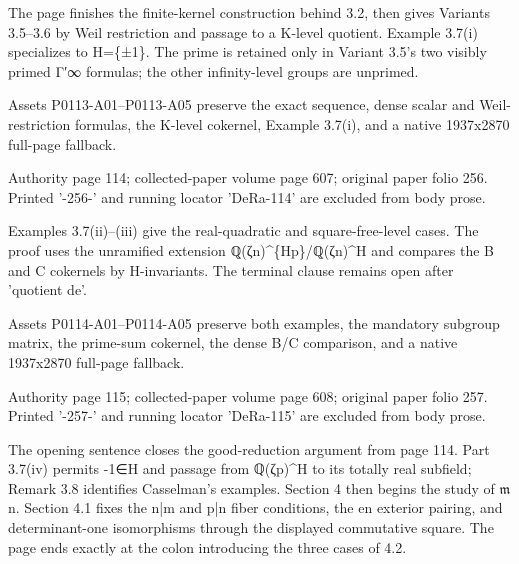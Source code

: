 \documentclass[11pt,a4paper]{article}
\begin{document}
The page finishes the finite-kernel construction behind 3.2, then gives Variants 3.5--3.6 by Weil restriction and passage to a K-level quotient. Example 3.7(i) specializes to H=\{±1\}. The prime is retained only in Variant 3.5's two visibly primed Γ′\textunderscore{}∞ formulas; the other infinity-level groups are unprimed.

Assets P0113-A01--P0113-A05 preserve the exact sequence, dense scalar and Weil-restriction formulas, the K-level cokernel, Example 3.7(i), and a native 1937x2870 full-page fallback.


\par\medskip
\hypertarget{D018-P0114}{}
\par\smallskip
Authority page 114; collected-paper volume page 607; original paper folio 256. Printed '-256-' and running locator 'DeRa-114' are excluded from body prose.

Examples 3.7(ii)--(iii) give the real-quadratic and square-free-level cases. The proof uses the unramified extension ℚ(ζ\textunderscore{}n)\textasciicircum{}\{H\textunderscore{}p\}/ℚ(ζ\textunderscore{}n)\textasciicircum{}H and compares the B and C cokernels by H-invariants. The terminal clause remains open after 'quotient de'.

Assets P0114-A01--P0114-A05 preserve both examples, the mandatory subgroup matrix, the prime-sum cokernel, the dense B/C comparison, and a native 1937x2870 full-page fallback.


\par\medskip
\hypertarget{D018-P0115}{}
\par\smallskip
Authority page 115; collected-paper volume page 608; original paper folio 257. Printed '-257-' and running locator 'DeRa-115' are excluded from body prose.

The opening sentence closes the good-reduction argument from page 114. Part 3.7(iv) permits -1∈H and passage from ℚ(ζ\textunderscore{}p)\textasciicircum{}H to its totally real subfield; Remark 3.8 identifies Casselman's examples. Section 4 then begins the study of \ensuremath{\mathfrak{m}}\textunderscore{}n. Section 4.1 fixes the n|m and p|n fiber conditions, the e\textunderscore{}n exterior pairing, and determinant-one isomorphisms through the displayed commutative square. The page ends exactly at the colon introducing the three cases of 4.2.
\end{document}
